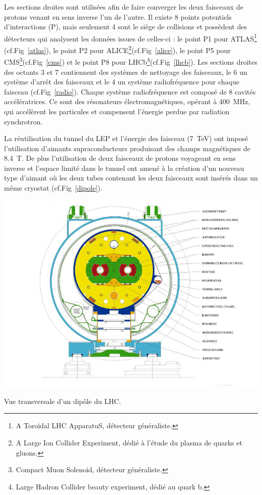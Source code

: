 Les sections droites sont utilisées afin de faire converger les deux faisceaux de protons venant en sens inverse l'un de l'autre. Il existe \num{8} points potentiels d'interactions (P), mais seulement \num{4} sont le siège de collisions et possèdent des détecteurs qui analysent les données issues de celles-ci : le point P1 pour ATLAS\footnote{A Toroidal LHC ApparatuS, détecteur généraliste.} (cf.Fig~\ref{atlas}), le point P2 pour ALICE\footnote{A Large Ion Collider Experiment, dédié à l'étude du plasma de quarks et gluons.}(cf.Fig~\ref{alice}), le point P5 pour CMS\footnote{Compact Muon Solenoid, détecteur généraliste.}(cf.Fig~\ref{cms}) et le point P8 pour LHCb\footnote{Large Hadron Collider beauty experiment, dédié au quark b.}(cf.Fig~\ref{lhcb}). Les sections droites des octants \num{3} et \num{7} contiennent des systèmes de nettoyage des faisceaux, le \num{6} un système d'arrêt des faisceaux et le \num{4} un système radiofréquence pour chaque faisceau (cf.Fig~\ref{radio}). Chaque système radiofréquence est composé de \num{8} cavités accélératrices. Ce sont des résonateurs électromagnétiques, opérant à \SI{400}{\mega\hertz}, qui accélèrent les particules et compensent l'énergie perdue par radiation synchrotron.

La réutilisation du tunnel du LEP et l'énergie des faisceau (\SI{7}{\tera\eV}) ont imposé l'utilisation d'aimants supraconducteurs produisant des champs magnétiques de \SI{8.4}{\tesla}. De plus l'utilisation de deux faisceaux de protons voyageant en sens inverse et l'espace limité dans le tunnel ont amené à la création d'un nouveau type d'aimant où les deux tubes contenant les deux faisceaux sont insérés dans un même cryostat (cf.Fig~\ref{dipole}).

\begin{minipagewithmarginpars}[ht!]{0.95\textwidth}
\centering
\includegraphics[width=1.0\textwidth]{LHC/dipole.jpg}
\captionsetup{type=figure}\caption{Vue transversale d'un dipôle du LHC.}
\label{dipole}	
\end{minipagewithmarginpars}

